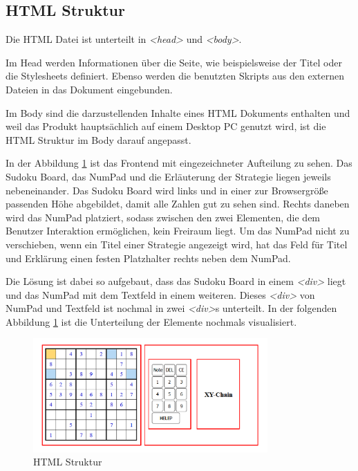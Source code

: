 \subsection{HTML Struktur}
Die \ac{HTML} Datei ist unterteilt in \textit{<head>} und \textit{<body>}. 

Im Head werden Informationen über die Seite, wie beispielsweise der Titel oder die Stylesheets definiert. Ebenso werden die benutzten Skripts aus den externen Dateien in das Dokument eingebunden. 

Im Body sind die darzustellenden Inhalte eines \ac{HTML} Dokuments enthalten und weil das Produkt hauptsächlich auf einem Desktop PC genutzt wird, ist die \ac{HTML} Struktur im Body darauf angepasst.

In der Abbildung \ref{fig:AbbildungFrontend} ist das Frontend mit eingezeichneter Aufteilung zu sehen. Das Sudoku Board, das NumPad und die Erläuterung der Strategie liegen jeweils nebeneinander. Das Sudoku Board wird links und in einer zur Browsergröße passenden Höhe abgebildet, damit alle Zahlen gut zu sehen sind. Rechts daneben wird das NumPad platziert, sodass zwischen den zwei Elementen, die dem Benutzer Interaktion ermöglichen, kein Freiraum liegt. Um das NumPad nicht zu verschieben, wenn ein Titel einer Strategie angezeigt wird, hat das Feld für Titel und Erklärung einen festen Platzhalter rechts neben dem NumPad.

Die Lösung ist dabei so aufgebaut, dass das Sudoku Board in einem \textit{<div>} liegt und das NumPad mit dem Textfeld in einem weiteren. Dieses \textit{<div>} von NumPad und Textfeld ist nochmal in zwei \textit{<div>}s unterteilt. In der folgenden Abbildung \ref{fig:AbbildungFrontend} ist die Unterteilung der Elemente nochmals visualisiert.

\begin{figure}[H]
	\centering
	\includegraphics[width=0.8\textwidth]{images/AbbildungFrontendRot.png}
	\caption{\ac{HTML} Struktur}
	\label{fig:AbbildungFrontend}
\end{figure}

